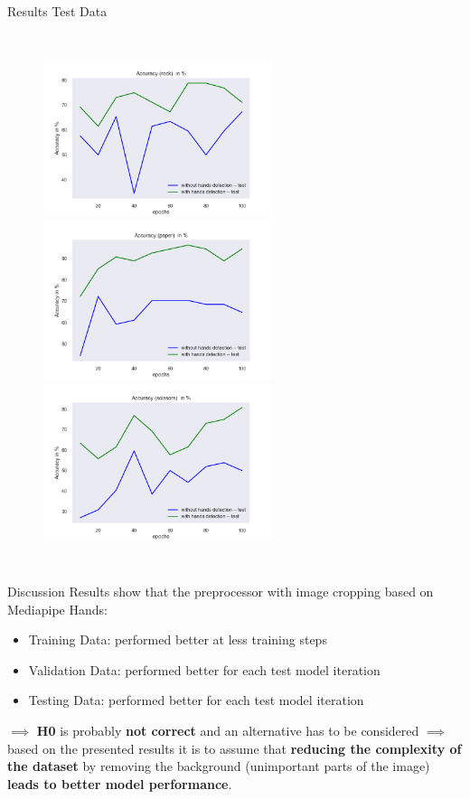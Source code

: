 \documentclass[aspectratio=169]{beamer}
\newcommand{\pop}[1]{{\color{niceorange}\textbf{#1}}}
\begin{document}
{\begin{frame}{Results Test Data}
\begin{columns}
    \begin{figure}
        \centering
        \includegraphics[width=0.6\textwidth]{img/experiment/model_comp_10steps__test_acc_rock.png}     
        \includegraphics[width=0.6\textwidth]{img/experiment/model_comp_10steps__test_acc_paper.png}
        \includegraphics[width=0.6\textwidth]{img/experiment/model_comp_10steps__test_acc_scissors.png}
    \end{figure}
   
	\end{columns}
	\end{frame}


	\begin{frame}{Discussion}
	Results show that the preprocessor with image cropping based on Mediapipe Hands:
	\begin{itemize}
		\item Training Data: performed better at less training steps 
		\item Validation Data: performed better for each test model iteration
		\item Testing Data: performed better for each test model iteration
	\end{itemize}
	\pause
	$\implies$ \pop{H0} is probably \pop{not correct} and an alternative has to be considered
	\pause
	\newline
	$\implies$ based on the presented results it is to assume that \pop{reducing the complexity of the dataset} by removing the background (unimportant parts of the image) \pop{leads to better model performance}.
	

\end{frame}}
\end{document}

